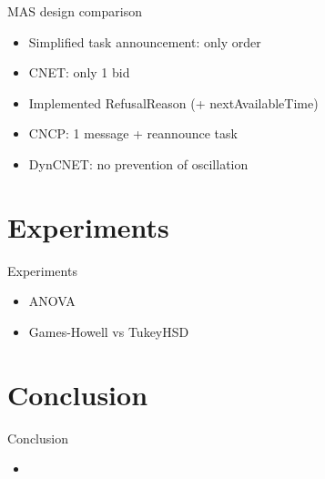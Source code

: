 \documentclass{beamer}
\begin{document}
	\begin{frame}{MAS design comparison}
		\begin{itemize}
			\item Simplified task announcement: only order
			\item CNET: only 1 bid
			\item Implemented RefusalReason (+ nextAvailableTime)
			\item CNCP: 1 message + reannounce task
			\item DynCNET: no prevention of oscillation
		\end{itemize}
	\end{frame}
	
	\section{Experiments}
	\begin{frame}{Experiments}
		\begin{itemize}
			\item ANOVA
			\item Games-Howell vs TukeyHSD
		\end{itemize}
	\end{frame}
	
	\section{Conclusion}
	\begin{frame}{Conclusion}
		\begin{itemize}
			\item
		\end{itemize}
	\end{frame}
	
\end{document}
